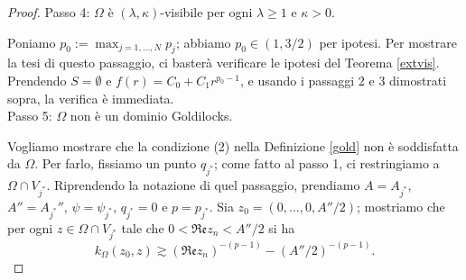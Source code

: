\begin{proof}
    Passo 4: $\Omega$ è $(\lambda,\kappa)$-visibile per ogni $\lambda\ge 1$ e $\kappa>0$.

    Poniamo $p_0:=\displaystyle\max_{j=1,\dots,N} p_j$; abbiamo $p_0\in(1,3/2)$ per ipotesi. Per mostrare la tesi di questo passaggio, ci basterà verificare le ipotesi del Teorema \ref{extvis}. Prendendo $S=\emptyset$ e $f(r)=C_0+C_1r^{p_0-1}$, e usando i passaggi 2 e 3 dimostrati sopra, la verifica è immediata.\\

    Passo 5: $\Omega$ non è un dominio Goldilocks.

    Vogliamo mostrare che la condizione (2) nella Definizione \ref{gold} non è soddisfatta da $\Omega$. Per farlo, fissiamo un punto $q_{j^*}$; come fatto al passo 1, ci restringiamo a $\Omega\cap V_{j^*}$. Riprendendo la notazione di quel passaggio, prendiamo $A=A_{j^*}$, $A''=A_{j^*}''$, $\psi=\psi_{j^*}$, $q_{j^*}=0$ e $p=p_{j^*}$. Sia $z_0=(0,\dots,0,A''/2)$; mostriamo che per ogni $z\in\Omega\cap V_{j^*}$ tale che $0<\mathfrak{Re}z_n<A''/2$ si ha
    \begin{equation}\label{7punto14}
        k_\Omega(z_0,z)\gtrsim(\mathfrak{Re}z_n)^{-(p-1)}-(A''/2)^{-(p-1)}.
    \end{equation}


\end{proof}
